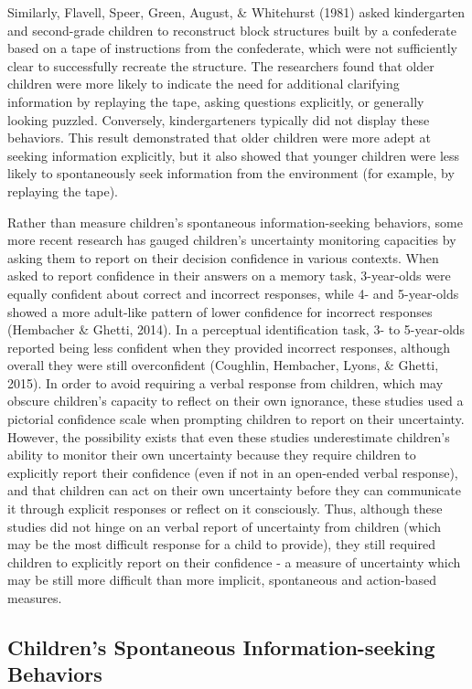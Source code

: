 \documentclass[floatsintext,man]{apa6}
\theoremstyle{definition}
\theoremstyle{definition}
\theoremstyle{definition}
\theoremstyle{remark}
\begin{document}
Similarly, Flavell, Speer, Green, August, \& Whitehurst (1981) asked
kindergarten and second-grade children to reconstruct block structures
built by a confederate based on a tape of instructions from the
confederate, which were not sufficiently clear to successfully recreate
the structure. The researchers found that older children were more
likely to indicate the need for additional clarifying information by
replaying the tape, asking questions explicitly, or generally looking
puzzled. Conversely, kindergarteners typically did not display these
behaviors. This result demonstrated that older children were more adept
at seeking information explicitly, but it also showed that younger
children were less likely to spontaneously seek information from the
environment (for example, by replaying the tape).

Rather than measure children's spontaneous information-seeking
behaviors, some more recent research has gauged children's uncertainty
monitoring capacities by asking them to report on their decision
confidence in various contexts. When asked to report confidence in their
answers on a memory task, 3-year-olds were equally confident about
correct and incorrect responses, while 4- and 5-year-olds showed a more
adult-like pattern of lower confidence for incorrect responses
(Hembacher \& Ghetti, 2014). In a perceptual identification task, 3- to
5-year-olds reported being less confident when they provided incorrect
responses, although overall they were still overconfident (Coughlin,
Hembacher, Lyons, \& Ghetti, 2015). In order to avoid requiring a verbal
response from children, which may obscure children's capacity to reflect
on their own ignorance, these studies used a pictorial confidence scale
when prompting children to report on their uncertainty. However, the
possibility exists that even these studies underestimate children's
ability to monitor their own uncertainty because they require children
to explicitly report their confidence (even if not in an open-ended
verbal response), and that children can act on their own uncertainty
before they can communicate it through explicit responses or reflect on
it consciously. Thus, although these studies did not hinge on an verbal
report of uncertainty from children (which may be the most difficult
response for a child to provide), they still required children to
explicitly report on their confidence - a measure of uncertainty which
may be still more difficult than more implicit, spontaneous and
action-based measures.

\subsection{Children's Spontaneous Information-seeking
Behaviors}\label{childrens-spontaneous-information-seeking-behaviors}
\end{document}
